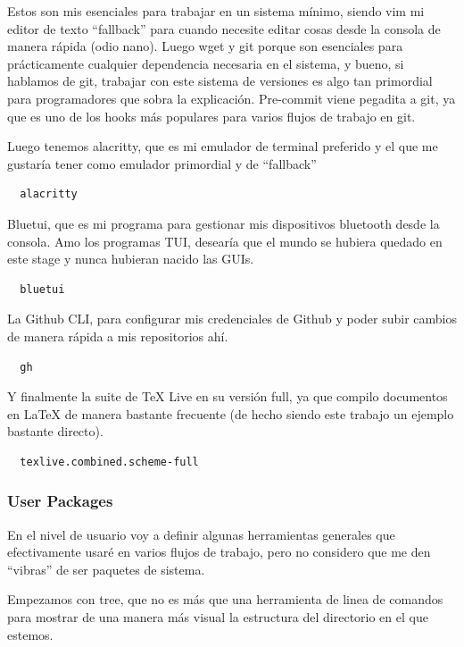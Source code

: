 \documentclass[11pt]{article}
\begin{document}
Estos son mis esenciales para trabajar en un sistema mínimo, siendo vim mi editor de texto ``fallback'' para cuando necesite editar cosas desde la consola de manera rápida (odio nano). Luego wget y git porque son esenciales para prácticamente cualquier dependencia necesaria en el sistema, y bueno, si hablamos de git, trabajar con este sistema de versiones es algo tan primordial para programadores que sobra la explicación. Pre-commit viene pegadita a git, ya que es uno de los hooks más populares para varios flujos de trabajo en git.

Luego tenemos alacritty, que es mi emulador de terminal preferido y el que me gustaría tener como emulador primordial y de ``fallback''

\begin{verbatim}
  alacritty
\end{verbatim}

Bluetui, que es mi programa para gestionar mis dispositivos bluetooth desde la consola. Amo los programas TUI, desearía que el mundo se hubiera quedado en este stage y nunca hubieran nacido las GUIs.

\begin{verbatim}
  bluetui
\end{verbatim}

La Github CLI, para configurar mis credenciales de Github y poder subir cambios de manera rápida a mis repositorios ahí.

\begin{verbatim}
  gh
\end{verbatim}

Y finalmente la suite de \TeX{} Live en su versión full, ya que compilo documentos en \LaTeX{} de manera bastante frecuente (de hecho siendo este trabajo un ejemplo bastante directo).

\begin{verbatim}
  texlive.combined.scheme-full
\end{verbatim}
\subsubsection{User Packages}
\label{sec:org92e86d3}

En el nivel de usuario voy a definir algunas herramientas generales que efectivamente usaré en varios flujos de trabajo, pero no considero que me den ``vibras'' de ser paquetes de sistema.

Empezamos con tree, que no es más que una herramienta de linea de comandos para mostrar de una manera más visual la estructura del directorio en el que estemos.
\end{document}
